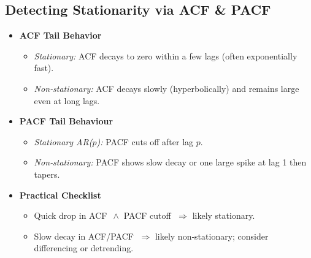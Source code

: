 \documentclass{article}
\begin{document}
\subsection*{Detecting Stationarity via ACF \& PACF}

\begin{itemize}
  \item \textbf{ACF Tail Behavior}  
    \begin{itemize}
      \item \emph{Stationary:} ACF decays to zero within a few lags (often exponentially fast).  
      \item \emph{Non‐stationary:} ACF decays slowly (hyperbolically) and remains large even at long lags.
    \end{itemize}

  \item \textbf{PACF Tail Behaviour}  
    \begin{itemize}
      \item \emph{Stationary AR(\(p\)):} PACF cuts off after lag \(p\).  
      \item \emph{Non‐stationary:} PACF shows slow decay or one large spike at lag 1 then tapers.
    \end{itemize}

  \item[\(\bullet\)] \textbf{Practical Checklist}  
    \begin{itemize}
      \item Quick drop in ACF \(\,\land\) PACF cutoff \(\;\Rightarrow\) likely stationary.  
      \item Slow decay in ACF/PACF \(\;\Rightarrow\) likely non‐stationary; consider differencing or detrending.
    \end{itemize}
\end{itemize}
\end{document}
